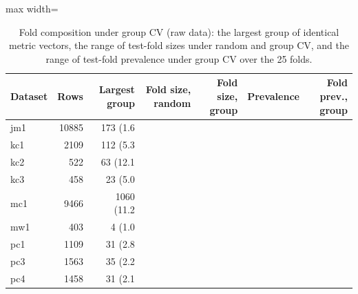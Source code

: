 \begin{table}[t]
\centering
\footnotesize
\caption{Fold composition under group CV (raw data): the largest group of identical metric vectors, the range of test-fold sizes under random and group CV, and the range of test-fold prevalence under group CV over the 25 folds.}
\label{tab:groupfolds}
\begin{adjustbox}{max width=\linewidth}
\begin{tabular}{lrrrrrr}
\toprule
Dataset & Rows & Largest group & Fold size, random & Fold size, group & Prevalence & Fold prev., group \\
\midrule
jm1 & 10885 & 173 (1.6\\%
kc1 & 2109 & 112 (5.3\\%
kc2 & 522 & 63 (12.1\\%
kc3 & 458 & 23 (5.0\\%
mc1 & 9466 & 1060 (11.2\\%
mw1 & 403 & 4 (1.0\\%
pc1 & 1109 & 31 (2.8\\%
pc3 & 1563 & 35 (2.2\\%
pc4 & 1458 & 31 (2.1\\%
\bottomrule
\end{tabular}
\end{adjustbox}
\end{table}

